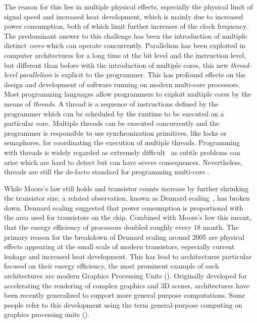 The reason for this lies in multiple physical effects, especially the physical limit of signal speed and increased heat development, which is mainly due to increased power consumption, both of which limit further increases of the clock frequency.
The predominant answer to this challenge has been the introduction of multiple distinct \emph{cores} which can operate concurrently.
Parallelism has been exploited in computer architectures for a long time at the bit level and the instruction level, but different than before with the introduction of multiple cores, this new \emph{thread-level parallelism} is explicit to the programmer.
This has profound effects on the design and development of software running on modern multi-core processors.
Most programming languages allow programmers to exploit multiple cores by the means of \emph{threads}.
A thread is a sequence of instructions defined by the programmer which can be scheduled by the runtime to be executed on a particular core.
Multiple threads can be executed concurrently and the programmer is responsible to use synchronization primitives, like locks or semaphores, for coordinating the execution of multiple threads.
Programming with threads is widely regarded as extremely difficult~\cite{} as subtle problems can arise which are hard to detect but can have severe consequences.
Nevertheless, threads are still the de-facto standard for programming multi-core \CPUs.

\bigskip

\noindent
While Moore's law still holds and transistor counts increase by further shrinking the transistor size, a related observation, known as Dennard scaling~\cite{DennardRiBaLe1974}, has broken down.
Dennard scaling suggested that power consumption is proportional with the area used for transistors on the chip.
Combined with Moore's law this meant, that the energy efficiency of processors doubled roughly every 18 month.
The primary reason for the breakdown of Dennard scaling around 2005 are physical effects appearing at the small scale of modern transistors, especially current leakage and increased heat development.
This has lead to architectures particular focused on their energy efficiency, the most prominent example of such architectures are modern Graphics Processing Units (\GPUs).
Originally developed for accelerating the rendering of complex graphics and 3D scenes, \GPUs architectures have been recently generalized to support more general purpose computations.
Some people refer to this development using the term general-purpose computing on graphics processing units (\GPGPU).

